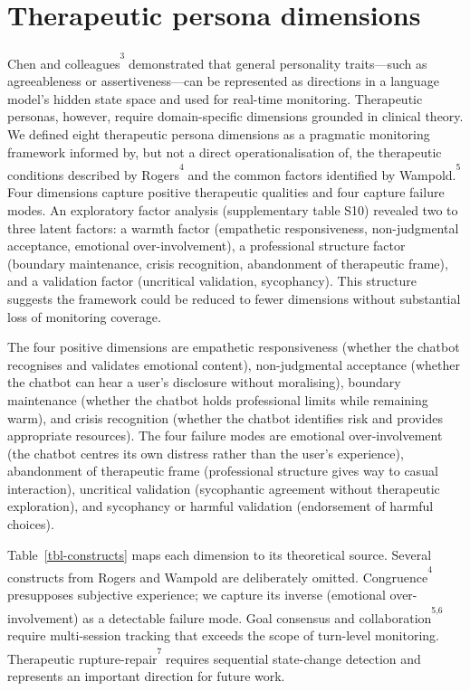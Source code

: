 \documentclass[
  10pt,
  a4paper,
  onecolumn]{article}
\begin{document}
\section{Therapeutic persona dimensions}\label{sec-dimensions}

Chen and colleagues\textsuperscript{\textsuperscript{3}} demonstrated
that general personality traits---such as agreeableness or
assertiveness---can be represented as directions in a language model's
hidden state space and used for real-time monitoring. Therapeutic
personas, however, require domain-specific dimensions grounded in
clinical theory. We defined eight therapeutic persona dimensions as a
pragmatic monitoring framework informed by, but not a direct
operationalisation of, the therapeutic conditions described by
Rogers\textsuperscript{\textsuperscript{4}} and the common factors
identified by Wampold.\textsuperscript{\textsuperscript{5}} Four
dimensions capture positive therapeutic qualities and four capture
failure modes. An exploratory factor analysis (supplementary table S10)
revealed two to three latent factors: a warmth factor (empathetic
responsiveness, non-judgmental acceptance, emotional over-involvement),
a professional structure factor (boundary maintenance, crisis
recognition, abandonment of therapeutic frame), and a validation factor
(uncritical validation, sycophancy). This structure suggests the
framework could be reduced to fewer dimensions without substantial loss
of monitoring coverage.

The four positive dimensions are empathetic responsiveness (whether the
chatbot recognises and validates emotional content), non-judgmental
acceptance (whether the chatbot can hear a user's disclosure without
moralising), boundary maintenance (whether the chatbot holds
professional limits while remaining warm), and crisis recognition
(whether the chatbot identifies risk and provides appropriate
resources). The four failure modes are emotional over-involvement (the
chatbot centres its own distress rather than the user's experience),
abandonment of therapeutic frame (professional structure gives way to
casual interaction), uncritical validation (sycophantic agreement
without therapeutic exploration), and sycophancy or harmful validation
(endorsement of harmful choices).

Table~\ref{tbl-constructs} maps each dimension to its theoretical
source. Several constructs from Rogers and Wampold are deliberately
omitted. Congruence\textsuperscript{\textsuperscript{4}} presupposes
subjective experience; we capture its inverse (emotional
over-involvement) as a detectable failure mode. Goal consensus and
collaboration\textsuperscript{\textsuperscript{5,6}} require
multi-session tracking that exceeds the scope of turn-level monitoring.
Therapeutic rupture-repair\textsuperscript{\textsuperscript{7}} requires
sequential state-change detection and represents an important direction
for future work.
\end{document}
